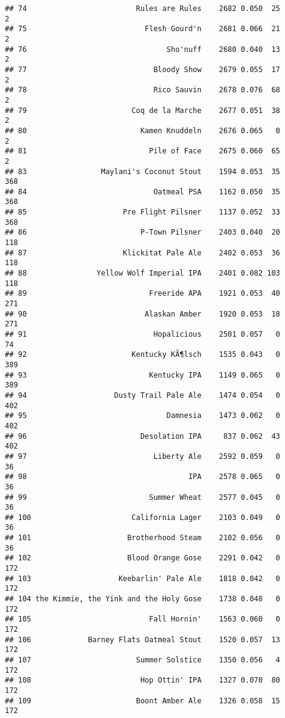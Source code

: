 \documentclass[
]{article}
\begin{document}
\begin{verbatim}
## 74                         Rules are Rules    2682 0.050  25          2
## 75                           Flesh Gourd'n    2681 0.066  21          2
## 76                                Sho'nuff    2680 0.040  13          2
## 77                             Bloody Show    2679 0.055  17          2
## 78                             Rico Sauvin    2678 0.076  68          2
## 79                        Coq de la Marche    2677 0.051  38          2
## 80                          Kamen Knuddeln    2676 0.065   0          2
## 81                            Pile of Face    2675 0.060  65          2
## 83                 Maylani's Coconut Stout    1594 0.053  35        368
## 84                             Oatmeal PSA    1162 0.050  35        368
## 85                      Pre Flight Pilsner    1137 0.052  33        368
## 86                          P-Town Pilsner    2403 0.040  20        118
## 87                      Klickitat Pale Ale    2402 0.053  36        118
## 88                Yellow Wolf Imperial IPA    2401 0.082 103        118
## 89                            Freeride APA    1921 0.053  40        271
## 90                           Alaskan Amber    1920 0.053  18        271
## 91                             Hopalicious    2501 0.057   0         74
## 92                        Kentucky KÃ¶lsch    1535 0.043   0        389
## 93                            Kentucky IPA    1149 0.065   0        389
## 94                    Dusty Trail Pale Ale    1474 0.054   0        402
## 95                                Damnesia    1473 0.062   0        402
## 96                          Desolation IPA     837 0.062  43        402
## 97                             Liberty Ale    2592 0.059   0         36
## 98                                     IPA    2578 0.065   0         36
## 99                            Summer Wheat    2577 0.045   0         36
## 100                       California Lager    2103 0.049   0         36
## 101                      Brotherhood Steam    2102 0.056   0         36
## 102                      Blood Orange Gose    2291 0.042   0        172
## 103                    Keebarlin' Pale Ale    1818 0.042   0        172
## 104 the Kimmie, the Yink and the Holy Gose    1738 0.048   0        172
## 105                           Fall Hornin'    1563 0.060   0        172
## 106             Barney Flats Oatmeal Stout    1520 0.057  13        172
## 107                        Summer Solstice    1350 0.056   4        172
## 108                         Hop Ottin' IPA    1327 0.070  80        172
## 109                        Boont Amber Ale    1326 0.058  15        172

\end{verbatim}
\end{document}
